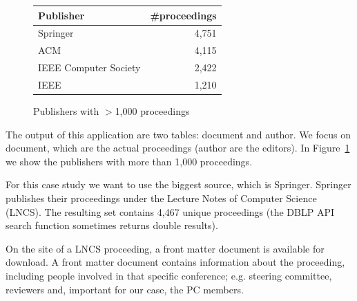 \documentclass{ou-report}
\newcommand{\lncs}{LNCS}
\begin{document}
\begin{figure}
    \centering
    \begin{tabular}{ lr }
        \toprule
        Publisher & \#proceedings \\
        \midrule
        Springer              & 4,751 \\
        ACM                   & 4,115 \\
        IEEE Computer Society & 2,422 \\
        IEEE                  & 1,210 \\
        \bottomrule
    \end{tabular}
    \caption{Publishers with $>$1,000 proceedings}
    \label{tbl:publisher-proceeding-count}
    
\end{figure}

The output of this application are two tables: document and author. We focus on
document, which are the actual proceedings (author are the editors).
In Figure~\ref{tbl:publisher-proceeding-count} we show the publishers with 
more than 1,000 proceedings.

For this case study we want to use the biggest source, which is Springer. 
Springer publishes their proceedings under the Lecture 
Notes of Computer Science (LNCS). The resulting set contains 4,467 unique 
proceedings (the DBLP API search function sometimes returns double results).

On the site of a \lncs{} proceeding, a front matter document is available for
download. A front matter document contains information about the proceeding,
including people involved in that specific conference; e.g. steering committee,
reviewers and, important for our case, the PC members.
\end{document}
